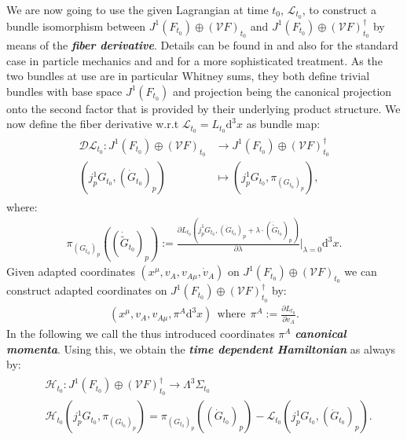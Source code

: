 We are now going to use the given Lagrangian at time $t_0$, $\mathcal{L}_{t_0}$, to construct a bundle isomorphism between $J^1(F_{t_0}) \oplus (\mathcal{V}F)_{t_0}$ and $J^1(F_{t_0}) \oplus (\mathcal{V}F)_{t_0}^{\dagger}$ by means of the \textit{\textbf{fiber derivative}}. Details can be found in \cite{abraham2008foundations} and also \cite{FiberDer} for the standard case in particle mechanics and \cite{2000RpMP...45...67G} and \cite{AIF_1973__23_1_203_0} for a more sophisticated treatment.
As the two bundles at use are in particular Whitney sums, they both define trivial bundles with base space $J^1(F_{t_0})$ and projection being the canonical projection onto the second factor that is provided by their underlying product structure. We now define the fiber derivative w.r.t $\mathcal{L}_{t_0} = L_{t_0}\mathrm{d}^3x$ as bundle map:
\begin{align}
\begin{aligned}
    \mathcal{D}\mathcal{L}_{t_0} : J^1(F_{t_0}) \oplus (\mathcal{V}F)_{t_0} &\longrightarrow J^1(F_{t_0}) \oplus (\mathcal{V}F)_{t_0}^{\dagger}\\
    (j^1_pG_{t_0},(\dot{G}_{t_0})_p) &\longmapsto (j^1_pG_{t_0},\pi_{(G_{t_0})_p}), 
\end{aligned}
\end{align}
where:
\begin{align}
\pi_{(G_{t_0})_p}((\dot{\widetilde{G}}_{t_0})_p) := \frac{\partial L_{t_0}(j_p^1G_{t_0}, (\dot{G}_{t_0})_p+\lambda \cdot (\dot{\widetilde{G}}_{t_0})_p)}{\partial \lambda } \bigg \vert _{\lambda = 0}\mathrm{d}^3x.
\end{align}
Given adapted coordinates $(x^{\mu},v_A, v_{A\mu}, \dot{v}_A)$ on $J^1(F_{t_0}) \oplus (\mathcal{V}F)_{t_0}$ we can construct adapted coordinates on $J^1(F_{t_0}) \oplus (\mathcal{V}F)_{t_0}^{\dagger}$ by:
\begin{align}
(x^\mu,v_A,v_{A\mu},\pi^A\mathrm{d}^3x) \ \ \text{where} \ \ \pi^A := \frac{\partial L_{t_0}}{\partial \dot{v}_A}.
\end{align}
In the following we call the thus introduced coordinates $\pi^A$ \textit{\textbf{canonical momenta}}.
Using this, we obtain the \textit{\textbf{time dependent Hamiltonian}} as always by:
\begin{align}\label{Ham}
\begin{aligned}
&\mathcal{H}_{t_0} : J^1(F_{t_0}) \oplus (\mathcal{V}F)_{t_0}^{\dagger} \longrightarrow \Lambda^3\Sigma_{t_0} \\
    &\mathcal{H}_{t_0}(j^1_pG_{t_0},\pi_{(G_{t_0})_p}) = \pi_{(G_{t_0})_p}((\dot{G}_{t_0})_p) - \mathcal{L}_{t_0}(j^1_pG_{t_0},(\dot{G}_{t_0})_p). 
\end{aligned}
\end{align}

